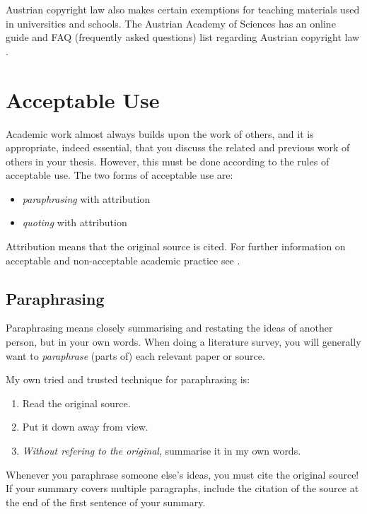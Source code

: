 Austrian copyright law \citep{UrhG} also makes certain exemptions for
teaching materials used in universities and schools. The Austrian
Academy of Sciences has an online guide and FAQ (frequently asked
questions) list regarding Austrian copyright law
\citep{KBLaw}.





\section{Acceptable Use}

Academic work almost always builds upon the work of others, and it is
appropriate, indeed essential, that you discuss the related and
previous work of others in your thesis. However, this must be done
according to the rules of acceptable use. The two forms of acceptable
use are:
\begin{itemize}
\item \emph{paraphrasing} with attribution
\item \emph{quoting} with attribution
\end{itemize}
Attribution means that the original source is cited.
For further information on acceptable and non-acceptable academic
practice see \citep{FremdeFedern,Wikipedia-Zitat}.




\subsection{Paraphrasing}

Paraphrasing means closely summarising and restating the ideas of
another person, but in your own words.
When doing a literature survey, you will generally want to
\emph{paraphrase} (parts of) each relevant paper or source.

My own tried and trusted technique for paraphrasing is:
\begin{enumerate}
\item Read the original source.
\item Put it down away from view.
\item \emph{Without refering to the original}, summarise it in my own words.
\end{enumerate}
Whenever you paraphrase someone else's ideas, you must cite the
original source! If your summary covers multiple paragraphs, include
the citation of the source at the end of the first sentence of your
summary.




